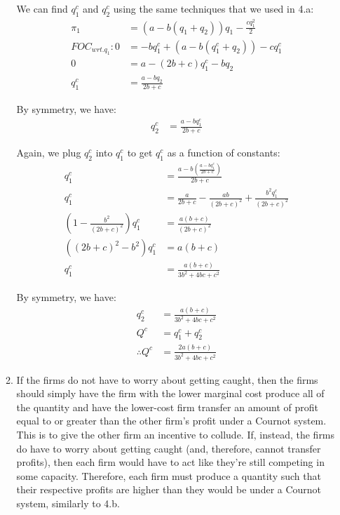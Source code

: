 \documentclass[12pt,letterpaper]{article}
\begin{document}
\begin{enumerate}
\begin{enumerate}
    We can find $q_1^c$ and $q_2^c$ using the same techniques that we used in 4.a:
    \begin{align*}
        \pi_1 &= (a - b(q_1 + q_2))q_1 - \frac{cq_1^2}{2}\\
        FOC_{wrt.q_1}: 0 &= -bq_1^c + (a-b(q_1^c + q_2)) - cq_1^c\\
        0 &= a - (2b + c)q_1^c - bq_2\\
        q_1^c &= \frac{a - bq_2}{2b + c}
    \end{align*}
    
    By symmetry, we have:
    \begin{align*}
        q_2^c &= \frac{a - bq_1^c}{2b + c}
    \end{align*}
    
    Again, we plug $q_2^c$ into $q_1^c$ to get $q_1^c$ as a function of constants:
    \begin{align*}
        q_1^c &= \frac{a - b(\frac{a - bq_1^c}{2b + c})}{2b + c}\\
        q_1^c &= \frac{a}{2b+c} - \frac{ab}{(2b+c)^2} + \frac{b^2q_1^c}{(2b+c)^2}\\
        (1-\frac{b^2}{(2b+c)^2})q_1^c &= \frac{a(b+c)}{(2b+c)^2}\\
        ((2b+c)^2 - b^2)q_1^c &= a(b+c)\\
        q_1^c &= \frac{a(b+c)}{3b^2 + 4bc + c^2}
    \end{align*}
    
    By symmetry, we have:
    \begin{align*}
        q_2^c &= \frac{a(b+c)}{3b^2 + 4bc + c^2}\\
        Q^c &= q_1^c + q_2^c\\
        \therefore Q^c &= \frac{2a(b+c)}{3b^2 + 4bc + c^2}
    \end{align*}
    
    \item If the firms do not have to worry about getting caught, then the firms should simply have the firm with the lower marginal cost produce all of the quantity and have the lower-cost firm transfer an amount of profit equal to or greater than the other firm's profit under a Cournot system. This is to give the other firm an incentive to collude. If, instead, the firms do have to worry about getting caught (and, therefore, cannot transfer profits), then each firm would have to act like they're still competing in some capacity. Therefore, each firm must produce a quantity such that their respective profits are higher than they would be under a Cournot system, similarly to 4.b.

\end{enumerate}


\end{enumerate}
	
\end{document}
